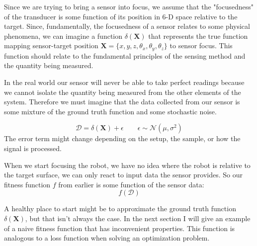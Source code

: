 \documentclass[11pt]{article}
\begin{document}
Since we are trying to bring a sensor into focus, we assume that the "focusedness" of the transducer is some function of its position in 6-D space relative to the target. Since, fundamentally, the focusedness of a sensor relates to some physical phenomena, we can imagine a function $\delta(\mathbf{X})$ that represents the true function mapping sensor-target position $\mathbf{X} = \{x,y,z,\theta_x,\theta_y, \theta_z\}$ to sensor focus.
This function should relate to the fundamental principles of the sensing method and the quantity being measured.

In the real world our sensor will never be able to take perfect readings because we cannot isolate the quantity being measured from the other elements of the system. Therefore we must imagine that the data collected from our sensor is some mixture of the ground truth function and some stochastic noise.

\begin{equation*}
    \mathcal{D} = \delta(\mathbf{X}) + \epsilon \qquad \epsilon \sim \mathcal{N}(\mu, \sigma^2)
\end{equation*}
The error term might change depending on the setup, the sample, or how the signal is processed.

When we start focusing the robot, we have no idea where the robot is relative to the target surface, we can only react to input data the sensor provides. So our fitness function $f$ from earlier is some function of the sensor data:
\begin{equation*}
    f(\mathcal{D})
\end{equation*}

A healthy place to start might be to approximate the ground truth function $\delta(\mathbf{X})$, but that isn't always the case. In the next section I will give an example of a naive fitness function that has inconvenient properties. This function is analogous to a loss function when solving an optimization problem.
\end{document}
